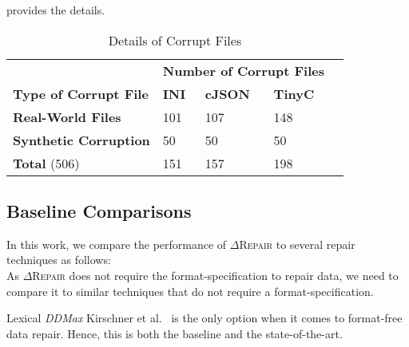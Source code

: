 \documentclass[acmsmall,screen,review,anonymous]{acmart}
\newcommand{\Formatfree}{Format-free\xspace}
\newcommand{\formatfree}{format-free\xspace}
\newcommand{\dtask}{data repair\xspace}
\newcommand{\approach}{\textsc{$\Delta$Repair}\xspace}
\newcommand{\ddmax}{\textit{DDMax}\xspace}
\newcommand{\drepair}{\approach}
\begin{document}
 provides the details.

%
\begin{table}[!tbp]\centering
\caption{Details of Corrupt Files}
\begin{tabular}{|p{4cm}|p{2cm}|p{2cm}|p{2cm}|p{2cm}|}
\hline
&  \multicolumn{3}{c|}{\textbf{Number of Corrupt Files}}  \\
\textbf{Type of Corrupt File} & \textbf{INI} & \textbf{cJSON} & \textbf{TinyC} \\
\hline
\textbf{Real-World Files} & 101 & 107 & 148 \\
\textbf{Synthetic Corruption} & 50 & 50    & 50 \\
\hline
\textbf{Total } (506) & 151 & 157    & 198 \\
\hline
\end{tabular}
\label{tab:inputdetails}
\end{table}

\subsection{Baseline Comparisons}
In this work, we compare the performance of \drepair to several repair
techniques as follows:\\

\noindent{\textbf{\Formatfree}.}
As \drepair does not require the format-specification to repair data, we
need to compare it to similar techniques that do not require a
format-specification.
\begin{description}[wide]

\item[\textbf{(1) Lexical \ddmax:}] Lexical \ddmax Kirschner et al.~\cite{kirschner2020debugging}
  is the only option when it comes to \formatfree \dtask. Hence, this is
  both the baseline and the state-of-the-art.
\end{description}
\end{document}
